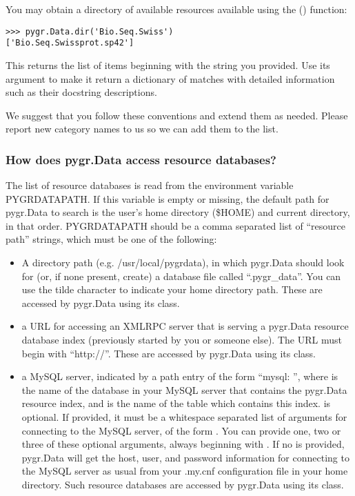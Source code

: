 \documentclass{howto}
\begin{document}
You may obtain a directory of available resources available using
the () function:
\begin{verbatim}
>>> pygr.Data.dir('Bio.Seq.Swiss')
['Bio.Seq.Swissprot.sp42']
\end{verbatim}
This returns the list of items beginning with the string
you provided.  Use its  argument to make it return a dictionary
of matches with detailed information such as their docstring descriptions.

We suggest that you follow these conventions and extend them as needed.
Please report new category names to us so we can add them to the list.

\subsubsection{How does pygr.Data access resource databases?}
The list of resource databases is read from the environment variable
PYGRDATAPATH.  If this variable is empty or missing, the default path
for pygr.Data to search is the user's home directory (\$HOME) and
current directory, in that order.  PYGRDATAPATH should be a comma separated list
of ``resource path'' strings, which must be one of the following:
\begin{itemize}
\item A directory path (e.g. /usr/local/pygrdata), in which pygr.Data should
look for (or, if none present, create) a database file called ``.pygr_data''.  
You can use the tilde character to indicate your home directory path.
These are accessed by pygr.Data using its  class.

\item a URL for accessing an XMLRPC server that is serving a pygr.Data
resource database index (previously started by you or someone else).
The URL must begin with ``http://''.
These are accessed by pygr.Data using its  class.

\item a MySQL server, indicated by a path entry of the form 
``mysql: '',
where  is the name of the database in your MySQL
server that contains the pygr.Data resource index,
and  is the name of the table which contains this index.
 is optional.  If provided, it must be a whitespace separated 
list of arguments for connecting to the MySQL server, of the form
  .  You can provide one, two
or three of these optional arguments, always beginning with .  
If no  is provided,
pygr.Data will get the host, user, and password information for connecting 
to the MySQL server as usual from your
.my.cnf configuration file in your home directory.
Such resource databases are accessed by pygr.Data using its 
 class.
\end{itemize}
\end{document}
